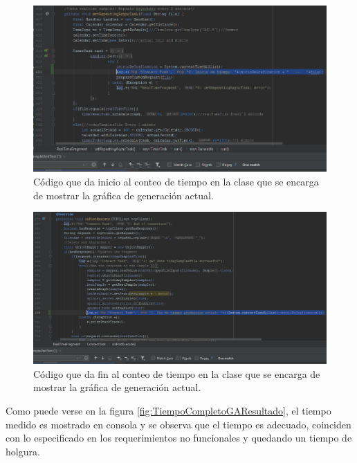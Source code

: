 \begin{figure}[H]
	\centering
	\includegraphics[scale=.6]{Capitulo5/images/TiempoCompletoCodigoInicio.png}
	\caption{Código que da inicio al conteo de tiempo en la clase que se encarga de mostrar la gráfica de generación actual.}	\label{fig:TiempoCompletoGAInicio}
\end{figure} 

\begin{figure}[H]
	\centering
	\includegraphics[scale=.6]{Capitulo5/images/TiempoCompletoCodigoFin.png}
	\caption{Código que da fin al conteo de tiempo en la clase que se encarga de mostrar la gráfica de generación actual.}	\label{fig:TiempoCompletoGAFin}
\end{figure} 

Como puede verse en la figura \ref{fig:TiempoCompletoGAResultado}, el tiempo medido es mostrado en consola y se observa que el tiempo es adecuado, coinciden con lo especificado en los requerimientos no funcionales y quedando un tiempo de holgura.\\ \newline

